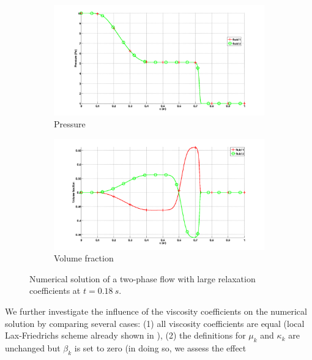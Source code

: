 \documentclass[preprint,10pt]{elsarticle}
\begin{document}
\begin{figure}[H]
        \begin{subfigure}[b]{0.495\textwidth}
                \centering
                \includegraphics[width=\textwidth]{../figures/paper/relaxation_two_phases_pressure_fo_lf.png}
                \caption{Pressure}
                \label{fig:two-phase-press}
        \end{subfigure}        
        \begin{subfigure}[b]{0.495\textwidth}
                \centering
                \includegraphics[width=\textwidth]{../figures/paper/relaxation_two_phases_volume_fraction_fo_lf.png}
                \caption{Volume fraction}
                \label{fig:two-phase-vf}
        \end{subfigure}
        \caption{Numerical solution of a two-phase flow with large relaxation coefficients at $t=0.18 \ s$.}\label{fig:two-phase}
\end{figure}
%
We further investigate the influence of the viscosity coefficients on the numerical solution by comparing several cases:
(1) all viscosity coefficients are equal (local Lax-Friedrichs scheme already shown in ), 
(2) the definitions for $\mu_k$ and $\kappa_k$ are unchanged but $\beta_k$ is set to zero (in doing so, we assess the effect 
\end{document}
